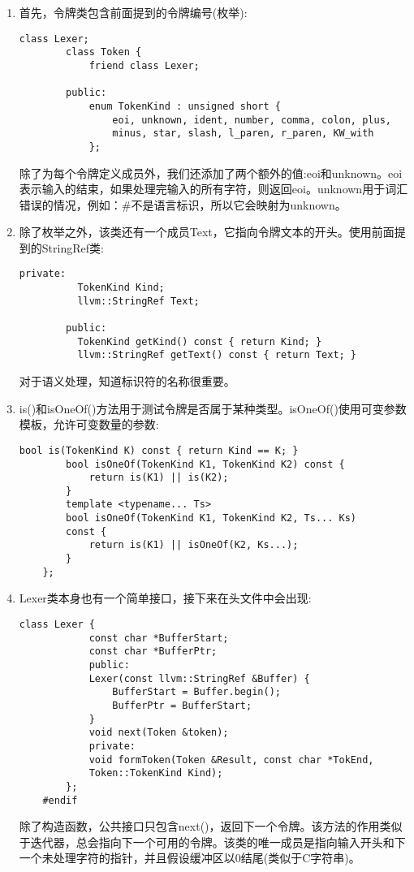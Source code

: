 \begin{enumerate}
	\item 首先，令牌类包含前面提到的令牌编号(枚举):
	\begin{lstlisting}[caption={}]
		class Lexer;
	    class Token {
			friend class Lexer;
			
	    public:
			enum TokenKind : unsigned short {
				eoi, unknown, ident, number, comma, colon, plus,
				minus, star, slash, l_paren, r_paren, KW_with
			};
	\end{lstlisting}
	除了为每个令牌定义成员外，我们还添加了两个额外的值:eoi和unknown。eoi表示输入的结束，如果处理完输入的所有字符，则返回eoi。unknown用于词汇错误的情况，例如：\#不是语言标识，所以它会映射为unknown。 
	
	\item 除了枚举之外，该类还有一个成员Text，它指向令牌文本的开头。使用前面提到的StringRef类:
	\begin{lstlisting}[caption={}]
		private:
		  TokenKind Kind;
		  llvm::StringRef Text;
		  
		public:
		  TokenKind getKind() const { return Kind; }
		  llvm::StringRef getText() const { return Text; }
	\end{lstlisting}
	对于语义处理，知道标识符的名称很重要。
	
	\item is()和isOneOf()方法用于测试令牌是否属于某种类型。isOneOf()使用可变参数模板，允许可变数量的参数:
	\begin{lstlisting}[caption={}]
		bool is(TokenKind K) const { return Kind == K; }
		bool isOneOf(TokenKind K1, TokenKind K2) const {
			return is(K1) || is(K2);
		}
		template <typename... Ts>
		bool isOneOf(TokenKind K1, TokenKind K2, Ts... Ks)
		const {
			return is(K1) || isOneOf(K2, Ks...);
		}
	};
	\end{lstlisting}

	\item Lexer类本身也有一个简单接口，接下来在头文件中会出现:
	\begin{lstlisting}[caption={}]
		class Lexer {
			const char *BufferStart;
			const char *BufferPtr;
			public:
			Lexer(const llvm::StringRef &Buffer) {
				BufferStart = Buffer.begin();
				BufferPtr = BufferStart;
			}
			void next(Token &token);
			private:
			void formToken(Token &Result, const char *TokEnd,
			Token::TokenKind Kind);
		};
	#endif
	\end{lstlisting}
	除了构造函数，公共接口只包含next()，返回下一个令牌。该方法的作用类似于迭代器，总会指向下一个可用的令牌。该类的唯一成员是指向输入开头和下一个未处理字符的指针，并且假设缓冲区以0结尾(类似于C字符串)。
	

\end{enumerate}
